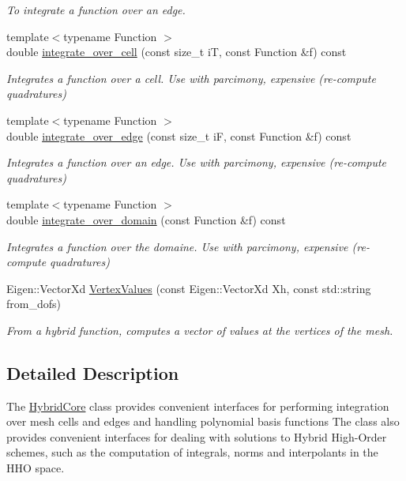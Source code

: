 \begin{DoxyCompactItemize}
\begin{DoxyCompactList}\small\item\em To integrate a function over an edge. \end{DoxyCompactList}\item 
{\footnotesize template$<$typename Function $>$ }\\double \hyperlink{group__HybridCore_ga64ffbc44306e06018efe3cea5a62f652}{integrate\+\_\+over\+\_\+cell} (const size\+\_\+t iT, const Function \&f) const
\begin{DoxyCompactList}\small\item\em Integrates a function over a cell. Use with parcimony, expensive (re-\/compute quadratures) \end{DoxyCompactList}\item 
{\footnotesize template$<$typename Function $>$ }\\double \hyperlink{group__HybridCore_ga03f276ea9c905d64662c39b7555d560c}{integrate\+\_\+over\+\_\+edge} (const size\+\_\+t iF, const Function \&f) const
\begin{DoxyCompactList}\small\item\em Integrates a function over an edge. Use with parcimony, expensive (re-\/compute quadratures) \end{DoxyCompactList}\item 
{\footnotesize template$<$typename Function $>$ }\\double \hyperlink{group__HybridCore_gab058c4e54d1e33c49e537b8d0f602848}{integrate\+\_\+over\+\_\+domain} (const Function \&f) const
\begin{DoxyCompactList}\small\item\em Integrates a function over the domaine. Use with parcimony, expensive (re-\/compute quadratures) \end{DoxyCompactList}\item 
Eigen\+::\+Vector\+Xd \hyperlink{classHArDCore2D_1_1HybridCore_a4e623d59fe09c23c4b714541e4aff5ea}{Vertex\+Values} (const Eigen\+::\+Vector\+Xd Xh, const std\+::string from\+\_\+dofs)
\begin{DoxyCompactList}\small\item\em From a hybrid function, computes a vector of values at the vertices of the mesh. \end{DoxyCompactList}\end{DoxyCompactItemize}


\subsection{Detailed Description}
The \hyperlink{classHArDCore2D_1_1HybridCore}{Hybrid\+Core} class provides convenient interfaces for performing integration over mesh cells and edges and handling polynomial basis functions The class also provides convenient interfaces for dealing with solutions to Hybrid High-\/\+Order schemes, such as the computation of integrals, norms and interpolants in the H\+HO space. 

